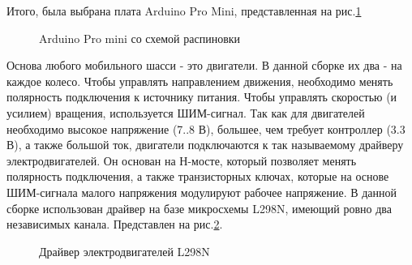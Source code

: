 \documentclass[14pt,a4paper,russian]{scrartcl}
\begin{document}
Итого, была выбрана плата Arduino Pro Mini, представленная на рис.\ref{fig:pro_mini}
\begin{figure}[h]
    \caption{Arduino Pro mini со схемой распиновки}
    \label{fig:pro_mini}
\end{figure}

Основа любого мобильного шасси - это двигатели. В данной сборке их два - на каждое
колесо. Чтобы управлять направлением движения, необходимо менять полярность подключения
к источнику питания. Чтобы управлять скоростью (и усилием) вращения, используется
ШИМ-сигнал. Так как для двигателей необходимо высокое напряжение (7..8 В), большее,
чем требует контроллер (3.3 В), а также большой ток, двигатели подключаются
к так называемому драйверу электродвигателей. Он основан на Н-мосте, который позволяет
менять полярность подключения, а также транзисторных ключах, которые на основе ШИМ-сигнала
малого напряжения модулируют рабочее напряжение. В данной сборке использован драйвер
на базе микросхемы L298N, имеющий ровно два независимых канала. 
Представлен на рис.\ref{fig:motor_driver}.
\begin{figure}[h]
    \caption{Драйвер электродвигателей L298N}
    \label{fig:motor_driver}
\end{figure}
\end{document}
